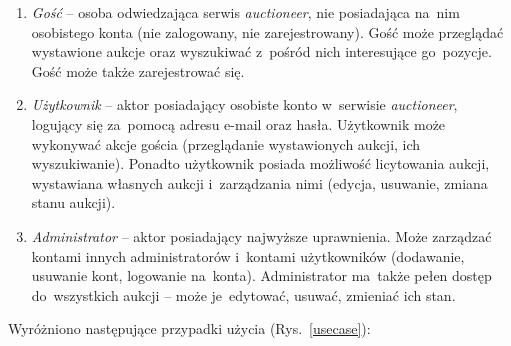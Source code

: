 \begin{enumerate}
  \item \textit{Gość} -- osoba odwiedzająca serwis \textit{auctioneer}, nie posiadająca na~nim osobistego konta (nie zalogowany, nie zarejestrowany). Gość może przeglądać wystawione aukcje oraz wyszukiwać z~pośród nich  interesujące go~pozycje. Gość może także zarejestrować się.
  \item \textit{Użytkownik} -- aktor posiadający osobiste konto w~serwisie \textit{auctioneer}, logujący się za~pomocą adresu e-mail oraz hasła. Użytkownik może wykonywać akcje gościa (przeglądanie wystawionych aukcji, ich wyszukiwanie). Ponadto użytkownik posiada możliwość licytowania aukcji, wystawiana własnych aukcji i~zarządzania nimi (edycja, usuwanie, zmiana stanu aukcji).
  \item \textit{Administrator} -- aktor posiadający najwyższe uprawnienia. Może zarządzać kontami innych administratorów i~kontami użytkowników (dodawanie, usuwanie kont, logowanie na~konta). Administrator ma~także pełen dostęp do~wszystkich aukcji -- może je~edytować, usuwać, zmieniać ich stan.
\end{enumerate}

Wyróżniono następujące przypadki użycia (Rys.~\ref{usecase}):

